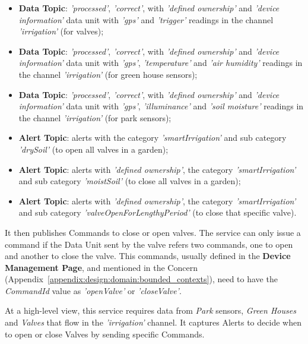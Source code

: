 \begin{itemize}
    \item \textbf{Data Topic}: \textit{'processed'}, \textit{'correct'}, with \textit{'defined ownership'} and \textit{'device information'} data unit with \textit{'gps'} and \textit{'trigger'} readings in the channel \textit{'irrigation'} (for valves);
    \item \textbf{Data Topic}: \textit{'processed'}, \textit{'correct'}, with \textit{'defined ownership'} and \textit{'device information'} data unit with \textit{'gps'}, \textit{'temperature'} and \textit{'air humidity'} readings in the channel \textit{'irrigation'} (for green house sensors);
    \item \textbf{Data Topic}: \textit{'processed'}, \textit{'correct'}, with \textit{'defined ownership'} and \textit{'device information'} data unit with \textit{'gps'}, \textit{'illuminance'} and \textit{'soil moisture'} readings in the channel \textit{'irrigation'} (for park sensors);
    \item \textbf{Alert Topic}: alerts with the category \textit{'smartIrrigation'} and sub category \textit{'drySoil'} (to open all valves in a garden);
    \item \textbf{Alert Topic}: alerts with \textit{'defined ownership'}, the category \textit{'smartIrrigation'} and sub category \textit{'moistSoil'} (to close all valves in a garden);
    \item \textbf{Alert Topic}: alerts with \textit{'defined ownership'}, the category \textit{'smartIrrigation'} and sub category \textit{'valveOpenForLengthyPeriod'} (to close that specific valve).
\end{itemize}

It then publishes Commands to close or open valves. The service can only issue a command if the Data Unit sent by the valve refers two commands, one to open and another to close the valve. This commands, usually defined in the \textbf{Device Management Page}, and mentioned in the  Concern  (Appendix~\ref{appendix:design:domain:bounded_contexts}), need to have the \textit{CommandId} value as \textit{'openValve'} or \textit{'closeValve'}.

At a high-level view, this service requires data from \textit{Park} sensors, \textit{Green Houses} and \textit{Valves} that flow in the \textit{'irrigation'} channel. It captures Alerts to decide when to open or close Valves by sending specific Commands.

